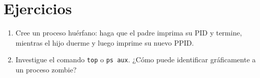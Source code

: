 \documentclass[12pt,a4paper]{article}
\begin{document}
\section{Ejercicios}
\begin{enumerate}
    \item Cree un proceso huérfano: haga que el padre imprima su PID y termine, mientras el hijo duerme y luego imprime su nuevo PPID.
    \item Investigue el comando \texttt{top} o \texttt{ps aux}. ¿Cómo puede identificar gráficamente a un proceso zombie?
\end{enumerate}
\end{document}
